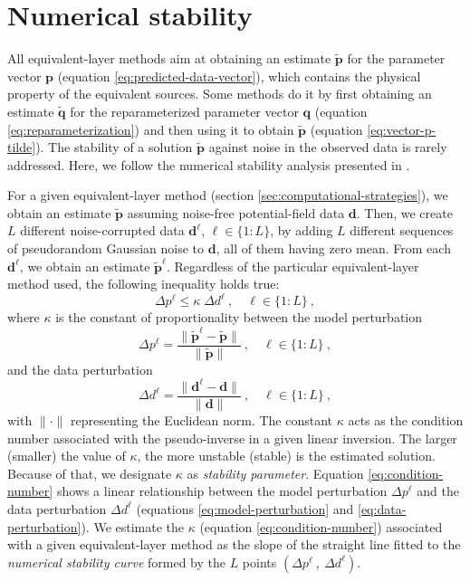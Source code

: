 \documentclass[utf8]{FrontiersinHarvard} %
\begin{document}
	\section{Numerical stability}
	
	All equivalent-layer methods aim at obtaining an estimate $\tilde{\mathbf{p}}$ for the parameter vector 
	$\mathbf{p}$ (equation \ref{eq:predicted-data-vector}), which contains the physical property of the equivalent sources.
	Some methods do it by first obtaining an estimate $\tilde{\mathbf{q}}$ for the reparameterized parameter vector $\mathbf{q}$
	(equation \ref{eq:reparameterization}) and then using it to obtain $\tilde{\mathbf{p}}$ (equation \ref{eq:vector-p-tilde}).
	The stability of a solution $\tilde{\mathbf{p}}$ against noise in the observed data is rarely addressed.
	Here, we follow the numerical stability analysis presented in \citet{siqueira-etal2017}.
	
	For a given equivalent-layer method (section \ref{sec:computational-strategies}), we obtain an estimate 
	$\tilde{\mathbf{p}}$ assuming noise-free potential-field data $\mathbf{d}$.
	Then, we create $L$ different noise-corrupted data $\mathbf{d}^{\ell}$, $\ell \in \{1:L\}$, by adding 
	$L$ different sequences of pseudorandom Gaussian noise to $\mathbf{d}$, all of them having zero mean. 
	From each $\mathbf{d}^{\ell}$, we obtain an estimate $\tilde{\mathbf{p}}^{\ell}$. 
	Regardless of the particular equivalent-layer method used, the following inequality \citep[][ p. 66]{aster_etal2019} 
	holds true:
	\begin{equation}
		\Delta p^{\ell} \leq \kappa \; \Delta d^{\ell} \: , \quad \ell \in \{1:L\} \: ,
		\label{eq:condition-number}
	\end{equation}
	where $\kappa$ is the constant of proportionality between the model perturbation
	\begin{equation}
		\Delta p^{\ell} = \frac{\| \tilde{\mathbf{p}}^{\ell} - \tilde{\mathbf{p}} \|}{\| \tilde{\mathbf{p}} \|}
		\: , \quad \ell \in \{1:L\} \: ,
		\label{eq:model-perturbation}
	\end{equation}
	and the data perturbation
	\begin{equation}
		\Delta d^{\ell} = \frac{\| \mathbf{d}^{\ell} - \mathbf{d} \|}{\| \mathbf{d} \|}
		\: , \quad \ell \in \{1:L\} \: ,
		\label{eq:data-perturbation}
	\end{equation}
	with $\| \cdot \|$ representing the Euclidean norm.
	The constant $\kappa$ acts as the condition number associated with the pseudo-inverse in a given linear inversion.
	The larger (smaller) the value of $\kappa$, the more unstable (stable) is the estimated solution.
	Because of that, we designate $\kappa$ as \textit{stability parameter}.
	Equation \ref{eq:condition-number} shows a linear relationship between the model perturbation $\Delta p^{\ell}$ and 
	the data perturbation $\Delta d^{\ell}$ (equations \ref{eq:model-perturbation} and \ref{eq:data-perturbation}).
	We estimate the $\kappa$ (equation \ref{eq:condition-number}) associated with a given 
	equivalent-layer method as the slope of the straight line fitted to the \textit{numerical stability curve} formed by the $L$ points 
	$\left( \Delta p^{\ell} \: , \: \Delta d^{\ell} \right)$.
	
\end{document}
